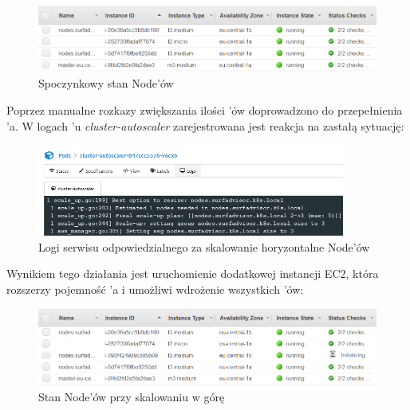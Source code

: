 \begin{figure}[H]
	\begin{center}
		\includegraphics[width=1\textwidth]{img/autoscaling/ca-normal}
	\end{center}
    \caption{Spoczynkowy stan Node'ów}
\end{figure}

Poprzez manualne rozkazy zwiększania ilości 'ów doprowadzono do przepełnienia 'a.
W logach 'u \emph{cluster-autoscaler} zarejestrowana jest reakcja na zastałą sytuację:

\begin{figure}[H]
	\begin{center}
		\includegraphics[width=0.9\textwidth]{img/autoscaling/ca-scale-up-logs}
	\end{center}
    \caption{Logi serwisu odpowiedzialnego za skalowanie horyzontalne Node'ów}
\end{figure}

Wynikiem tego działania jest uruchomienie dodatkowej instancji EC2, która rozszerzy pojemność 'a i umożliwi wdrożenie wszystkich 'ów:

\begin{figure}[H]
	\begin{center}
		\includegraphics[width=1\textwidth]{img/autoscaling/ca-scale-up}
	\end{center}
    \caption{Stan Node'ów przy skalowaniu w górę}
\end{figure}
